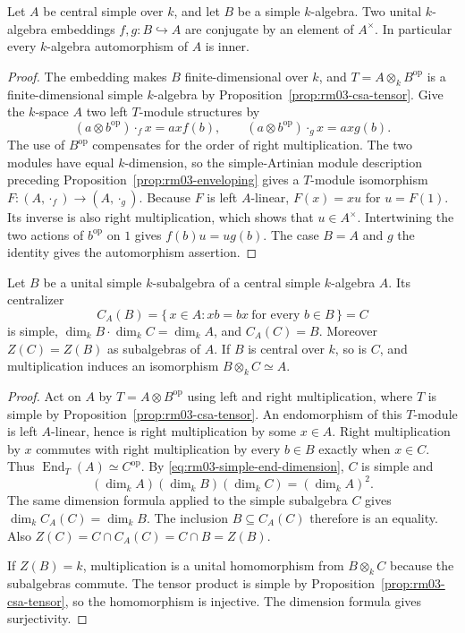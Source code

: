 \begin{theorem}
\label{thm:rm03-skolem-noether}
Let \(A\) be central simple over \(k\), and let \(B\) be a
simple \(k\)-algebra. Two unital \(k\)-algebra embeddings
\(f,g:B\hookrightarrow A\) are conjugate by an element of \(A^\times\).
In particular every \(k\)-algebra automorphism of \(A\) is inner.
\end{theorem}
\begin{proof}
The embedding makes \(B\) finite-dimensional over \(k\), and
\(T=A\otimes_k B^{\mathrm{op}}\) is a finite-dimensional simple
\(k\)-algebra by Proposition~\ref{prop:rm03-csa-tensor}.
Give the \(k\)-space \(A\) two left \(T\)-module structures by
\[
 (a\otimes b^{\mathrm{op}})\cdot_f x=axf(b),\qquad
 (a\otimes b^{\mathrm{op}})\cdot_g x=axg(b).
\]
The use of \(B^{\mathrm{op}}\) compensates for the order of right
multiplication. The two modules have equal \(k\)-dimension, so the
simple-Artinian module description preceding
Proposition~\ref{prop:rm03-enveloping} gives a \(T\)-module
isomorphism \(F:(A,\cdot_f)\to(A,\cdot_g)\).
Because \(F\) is left \(A\)-linear, \(F(x)=xu\) for \(u=F(1)\).
Its inverse is also right multiplication, which shows that
\(u\in A^\times\). Intertwining the two actions of \(b^{\mathrm{op}}\)
on \(1\) gives \(f(b)u=ug(b)\). The case \(B=A\) and \(g\) the
identity gives the automorphism assertion.
\end{proof}

\begin{theorem}
\label{thm:rm03-centralizer}
Let \(B\) be a unital simple \(k\)-subalgebra of a central simple
\(k\)-algebra \(A\). Its centralizer
\[
 C_A(B)=\{\,x\in A:xb=bx\ \text{for every }b\in B\,\}=C
\]
is simple, \(\dim_k B\cdot\dim_k C=\dim_k A\), and \(C_A(C)=B\).
Moreover \(Z(C)=Z(B)\) as subalgebras of \(A\).
If \(B\) is central over \(k\), so is \(C\), and multiplication
induces an isomorphism \(B\otimes_k C\simeq A\).
\end{theorem}
\begin{proof}
Act on \(A\) by \(T=A\otimes B^{\mathrm{op}}\) using left and right
multiplication, where \(T\) is simple by
Proposition~\ref{prop:rm03-csa-tensor}. An endomorphism of this
\(T\)-module is left \(A\)-linear, hence is right multiplication
by some \(x\in A\). Right multiplication by \(x\) commutes with
right multiplication by every \(b\in B\) exactly when \(x\in C\).
Thus \(\operatorname{End}_T(A)\simeq C^{\mathrm{op}}\).
By \eqref{eq:rm03-simple-end-dimension}, \(C\) is simple and
\[
 (\dim_k A)(\dim_k B)(\dim_k C)=(\dim_k A)^2.
\]
The same dimension formula applied to the simple subalgebra
\(C\) gives \(\dim_k C_A(C)=\dim_k B\). The inclusion
\(B\subseteq C_A(C)\) therefore is an equality. Also
\(Z(C)=C\cap C_A(C)=C\cap B=Z(B)\).

If \(Z(B)=k\), multiplication is a unital homomorphism from
\(B\otimes_k C\) because the subalgebras commute. The tensor
product is simple by Proposition~\ref{prop:rm03-csa-tensor},
so the homomorphism is injective. The dimension formula gives
surjectivity.
\end{proof}

